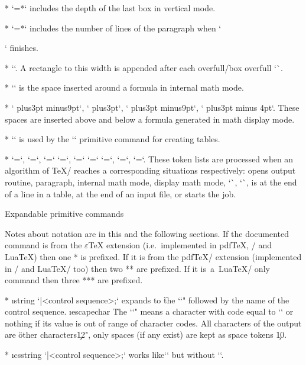 {* \y`\prevdepth=*` includes the depth of the last box in vertical mode.

* \y`\prevgraph=*` includes the number of lines of the paragraph when `\par`
  finishes.

* \y`\overfullrule=5pt`. A rectangle to this width is appended after each
  \ii overfull/box overfull `\hbox`.

* \y`\mathsurround=0pt` is the space inserted around a formula in internal math mode.

* \y`\abovedisplayskip=12pt plus3pt minus9pt`,
  \y`\abovedisplayshortskip=0pt plus3pt`,
  \y`\belowdisplayskip=12pt plus3pt minus9pt`,
  \y`\belowdisplayshortskip=7pt plus3pt minus 4pt`.
  These spaces are inserted above and below a formula generated in math display
  mode.

* \y`\tabskip=0pt` is used by the `\halign` primitive command for creating tables.

* \y`\output={\plainoutput}`, \y`\everypar={}`, \y`\everymath={}`
  \y`\everydisplay={}`, 
  \y`\everyhbox={}`
  \y`\everyvbox={}`
  \y`\everycr={}`,
  \*\y`\everyeof={}`,
  \y`\everyjob={}`.
  These token lists are processed when an algorithm of \TeX/ reaches a corresponding
  situations respectively: opens output routine, paragraph, internal math mode, display
  math mode, \x`\vbox`, \x`\hbox`, is at the end of a line in a table,
  at the end of an input file, or starts the job.
\enditems

\sec[expand] Expandable primitive commands

Notes about notation are in this and the following sections. 
If the documented command is from the $\varepsilon$\TeX{} extension 
(i.e.\ implemented in pdf\TeX, \XeTeX/
and Lua\TeX) then one * is prefixed. If it is from the pdf\TeX/ extension
(implemented in \XeTeX/ and Lua\TeX/ too) then two ** are prefixed. 
If it is~a~Lua\TeX/ only command then three *** are prefixed.

\begitems
* \i string `\string|<control sequence>;` expands to \"the \x`\escapechar`"
  followed by the name of the control sequence. \i escapechar \"The \x`\escapechar`" means a
  character with code equal to \x`\escapechar` or nothing if its value is
  out of range of character codes.
  All characters of the output are \"other characters\c{12}", only spaces (if any exist)
  are kept as space tokens {}\c{10}. 

* \*\*\*\i csstring `\csstring|<control sequence>;` works like`\string` but without
  `\escapechar`.

}
